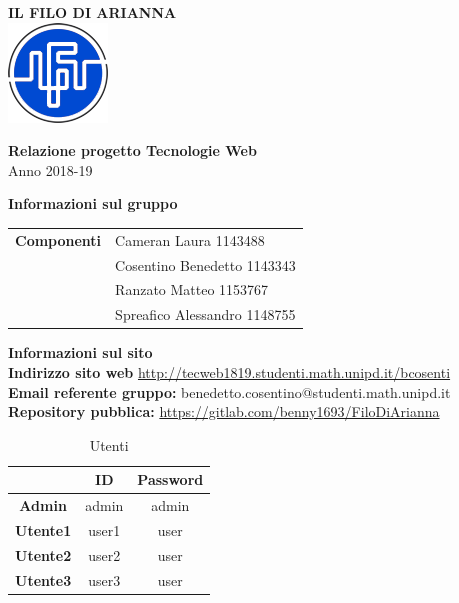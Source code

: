 \begin{center}
	\textbf{\Huge{IL FILO DI ARIANNA}}\\
	\vspace{15pt}
	\includegraphics{../img/logo.png}
\end{center}

\vspace{1.5cm}

\begin{center}
	\textbf{\huge{Relazione progetto Tecnologie Web}}\\[0.2cm]
	\Large{Anno 2018-19}
\end{center}

\vspace{5pt}

\begin{center}
	\textbf{\Large{Informazioni sul gruppo}}
\begin{table}[H]
	\hspace{3.5cm}
	\renewcommand{\arraystretch}{1.4}
	\begin{tabular}{l | l}
		\textbf{Componenti} & Cameran Laura 1143488\\
		& Cosentino Benedetto 1143343\\
		& Ranzato Matteo 1153767\\
		& Spreafico Alessandro 1148755\\
	\end{tabular}
\end{table}
\end{center}

\hspace{5pt}

\begin{center}
	\textbf{\Large{Informazioni sul sito}}\\
	\textbf{Indirizzo sito web} \url{http://tecweb1819.studenti.math.unipd.it/bcosenti}\\
	\textbf{Email referente gruppo:} benedetto.cosentino@studenti.math.unipd.it\\
	\textbf{Repository pubblica:} \url{https://gitlab.com/benny1693/FiloDiArianna}\\
	\renewcommand{\arraystretch}{1.8}
	\begin{longtable}[H]{c c c}
		\caption{Utenti}\\
		\rowcolor[HTML]{009ABB}
		\multicolumn{1}{c}{\color[HTML]{FFFFFF} \textbf{Utente}} &
		\multicolumn{1}{c}{\color[HTML]{FFFFFF} \textbf{ID}} &
		\multicolumn{1}{c}{\color[HTML]{FFFFFF} \textbf{Password}} \\
		\endhead
		\textbf{Admin} & admin & admin\\
		\textbf{Utente1} & user1 & user\\
		\textbf{Utente2} & user2 & user\\
		\textbf{Utente3} & user3 & user\\
	\end{longtable}
\end{center}